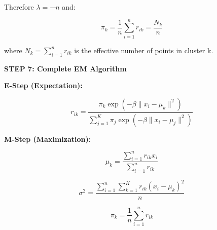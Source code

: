 \documentclass[12pt]{article}
\begin{document}
\begin{solution}
Therefore $\lambda = -n$ and:

\[
\pi_k = \frac{1}{n}\sum_{i=1}^n r_{ik} = \frac{N_k}{n}
\]

where $N_k = \sum_{i=1}^n r_{ik}$ is the effective number of points in cluster k.

\textbf{STEP 7: Complete EM Algorithm}

\textbf{E-Step (Expectation):}

\[
r_{ik} = \frac{\pi_k \exp(-\beta \|x_i - \mu_k\|^2)}{\sum_{j=1}^K \pi_j \exp(-\beta \|x_i - \mu_j\|^2)}
\]

\textbf{M-Step (Maximization):}

\[
\mu_k = \frac{\sum_{i=1}^n r_{ik} x_i}{\sum_{i=1}^n r_{ik}}
\]

\[
\sigma^2 = \frac{\sum_{i=1}^n \sum_{k=1}^K r_{ik}(x_i - \mu_k)^2}{n}
\]

\[
\pi_k = \frac{1}{n}\sum_{i=1}^n r_{ik}
\]

\end{solution}
\end{document}
